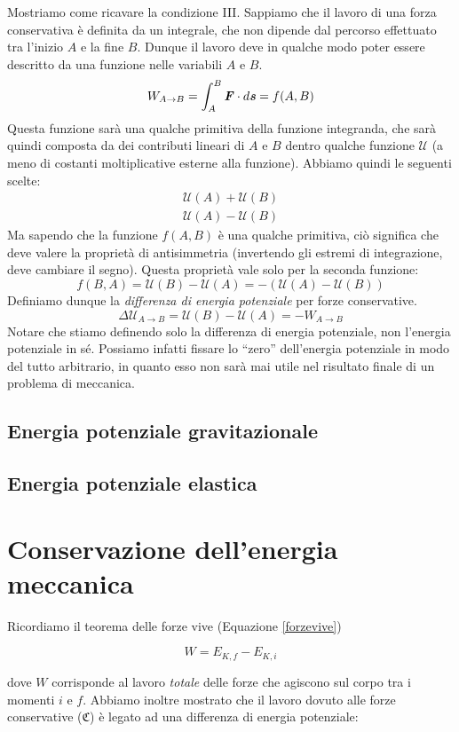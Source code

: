 Mostriamo come ricavare la condizione III. Sappiamo che il lavoro di una
forza conservativa è definita da un integrale, che non dipende dal percorso
effettuato tra l'inizio $A$ e la fine $B$. Dunque il lavoro deve in qualche modo
poter essere descritto da una funzione nelle variabili $A$ e $B$.
\[ W_{A \to B} = \int_{A}^{B}\textbf{\textit{F}}\cdot d\textbf{\textit{s}} = f(A,B) \]
Questa funzione sarà una qualche primitiva della funzione integranda, che sarà
quindi composta da dei contributi lineari di $A$ e $B$ dentro qualche funzione
$\mathcal{U}$ (a meno di costanti moltiplicative esterne alla funzione).
Abbiamo quindi le seguenti scelte:
\begin{align*}
    \mathcal{U}(A) + \mathcal{U}(B)\\
    \mathcal{U}(A) - \mathcal{U}(B)
\end{align*}
Ma sapendo che la funzione $f(A,B)$ è una qualche primitiva, ciò significa che
deve valere la proprietà di antisimmetria (invertendo gli estremi di integrazione,
deve cambiare il segno). Questa proprietà vale solo per la seconda funzione:
\[ f(B,A) = \mathcal{U}(B) - \mathcal{U}(A) = - (\mathcal{U}(A) - \mathcal{U}(B)) \]
Definiamo dunque la \textit{differenza di energia potenziale} per forze conservative.
\[ \Delta\mathcal{U}_{A\to B} = \mathcal{U}(B) - \mathcal{U}(A) = -W_{A\to B} \]
Notare che stiamo definendo solo la differenza di energia potenziale, non l'energia
potenziale in sé. Possiamo infatti fissare lo ``zero'' dell'energia potenziale in
modo del tutto arbitrario, in quanto esso non sarà mai utile nel risultato finale
di un problema di meccanica.

\subsection{Energia potenziale gravitazionale}
\subsection{Energia potenziale elastica}

\section{Conservazione dell'energia meccanica}
Ricordiamo il teorema delle forze vive (Equazione \ref{forzevive})

\[ W = E_{K,f} - E_{K,i} \]

\noindent dove $W$ corrisponde al lavoro \textit{totale} delle forze
che agiscono sul corpo tra i momenti $i$ e $f$.
Abbiamo inoltre mostrato che il lavoro dovuto alle forze conservative ($\mathfrak{C}$)
è legato ad una differenza di energia potenziale:


